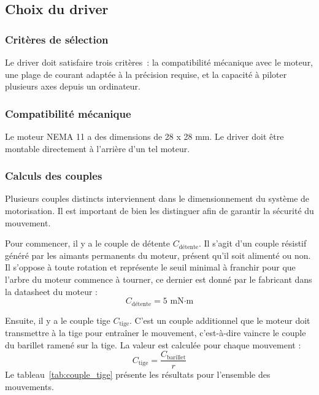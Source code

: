 \subsection{Choix du driver}
\label{sec:dim-driver}
\subsubsection{Critères de sélection}
Le driver doit satisfaire trois critères~: la compatibilité mécanique avec le moteur, une plage de courant adaptée à la précision requise, et la capacité à piloter plusieurs axes depuis un ordinateur.
\subsubsection{Compatibilité mécanique}
Le moteur NEMA 11 a des dimensions de 28 x 28 mm. 
Le driver doit être montable directement à l'arrière d'un tel moteur.
\subsubsection{Calculs des couples}

Plusieurs couples distincts interviennent dans le dimensionnement du système de motorisation. Il est important de bien les distinguer afin de garantir la sécurité du mouvement.

Pour commencer, il y a le couple de détente $C_{\text{détente}}$. Il s'agit d'un couple résistif généré par les aimants permanents du moteur, présent qu'il soit alimenté ou non. 
Il s'oppose à toute rotation et représente le seuil minimal à franchir pour que l'arbre du moteur commence à tourner, ce dernier est donné par le fabricant dans la datasheet du moteur :
\begin{equation}
    C_{\text{détente}} = 5 \text{ mN·m}
    \label{eq:couple_detente}
\end{equation}

Ensuite, il y a le couple tige $C_{\text{tige}}$. C'est un couple additionnel que le moteur doit transmettre à la tige pour entraîner le mouvement, c'est-à-dire vaincre le couple du barillet ramené sur la tige. La valeur est calculée pour chaque mouvement :
\begin{equation}
    C_{\text{tige}} = \frac{C_{\text{barillet}}}{r}
    \label{eq:couple_tige_formule}
\end{equation}
Le tableau~\ref{tab:couple_tige} présente les résultats pour l'ensemble des mouvements.

